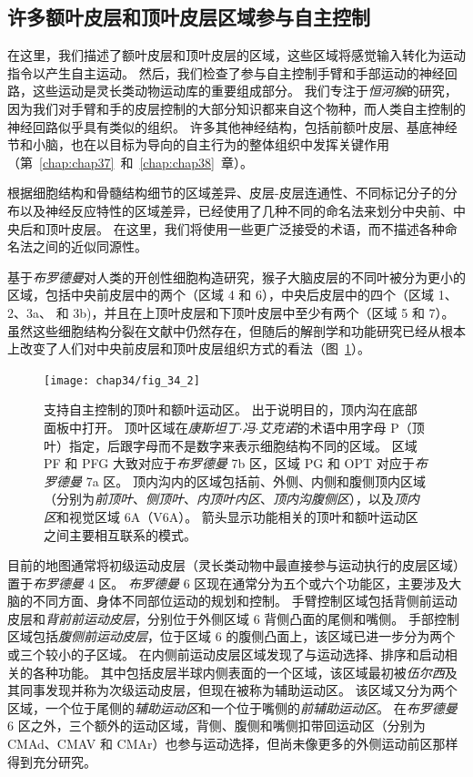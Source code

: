 \subsection{许多额叶皮层和顶叶皮层区域参与自主控制}

在这里，我们描述了额叶皮层和顶叶皮层的区域，这些区域将感觉输入转化为运动指令以产生自主运动。
然后，我们检查了参与自主控制手臂和手部运动的神经回路，这些运动是灵长类动物运动库的重要组成部分。
我们专注于\textit{恒河猴}的研究，因为我们对手臂和手的皮层控制的大部分知识都来自这个物种，而人类自主控制的神经回路似乎具有类似的组织。
许多其他神经结构，包括前额叶皮层、基底神经节和小脑，也在以目标为导向的自主行为的整体组织中发挥关键作用（第~\ref{chap:chap37}~和~\ref{chap:chap38}~章）。


根据细胞结构和骨髓结构细节的区域差异、皮层-皮层连通性、不同标记分子的分布以及神经反应特性的区域差异，已经使用了几种不同的命名法来划分中央前、中央后和顶叶皮层。
在这里，我们将使用一些更广泛接受的术语，而不描述各种命名法之间的近似同源性。


基于\textit{布罗德曼}对人类的开创性细胞构造研究，猴子大脑皮层的不同叶被分为更小的区域，包括中央前皮层中的两个（区域 4 和 6），中央后皮层中的四个（区域 1、2、3a、 和 3b)，并且在上顶叶皮层和下顶叶皮层中至少有两个（区域 5 和 7）。
虽然这些细胞结构分裂在文献中仍然存在，但随后的解剖学和功能研究已经从根本上改变了人们对中央前皮层和顶叶皮层组织方式的看法（图~\ref{fig:34_2}）。


\begin{figure}[htbp]
	\centering
	\texttt{[image: chap34/fig\_34\_2]}
	\caption{支持自主控制的顶叶和额叶运动区。
		出于说明目的，顶内沟在底部面板中打开。
		顶叶区域在\textit{康斯坦丁$\cdot$冯$\cdot$艾克诺}的术语中用字母 P（顶叶）指定，后跟字母而不是数字来表示细胞结构不同的区域。
		区域 PF 和 PFG 大致对应于\textit{布罗德曼} 7b 区，区域 PG 和 OPT 对应于\textit{布罗德曼} 7a 区。
		顶内沟内的区域包括前、外侧、内侧和腹侧顶内区域（分别为\textit{前顶叶}、\textit{侧顶叶}、\textit{内顶叶内区}、\textit{顶内沟腹侧区}），以及\textit{顶内区}和视觉区域 6A（V6A）。
		箭头显示功能相关的顶叶和额叶运动区之间主要相互联系的模式。}
	\label{fig:34_2}
\end{figure}


目前的地图通常将初级运动皮层（灵长类动物中最直接参与运动执行的皮层区域）置于\textit{布罗德曼} 4 区。
\textit{布罗德曼} 6 区现在通常分为五个或六个功能区，主要涉及大脑的不同方面、身体不同部位运动的规划和控制。
手臂控制区域包括背侧前运动皮层和\textit{背前前运动皮层}，分别位于外侧区域 6 背侧凸面的尾侧和嘴侧。
手部控制区域包括\textit{腹侧前运动皮层}，位于区域 6 的腹侧凸面上，该区域已进一步分为两个或三个较小的子区域。
在内侧前运动皮层区域发现了与运动选择、排序和启动相关的各种功能。
其中包括皮层半球内侧表面的一个区域，该区域最初被\textit{伍尔西}及其同事发现并称为次级运动皮层，但现在被称为辅助运动区。
该区域又分为两个区域，一个位于尾侧的\textit{辅助运动区}和一个位于嘴侧的\textit{前辅助运动区}。
在\textit{布罗德曼} 6 区之外，三个额外的运动区域，背侧、腹侧和嘴侧扣带回运动区（分别为 CMAd、CMAV 和 CMAr）也参与运动选择，但尚未像更多的外侧运动前区那样得到充分研究。


